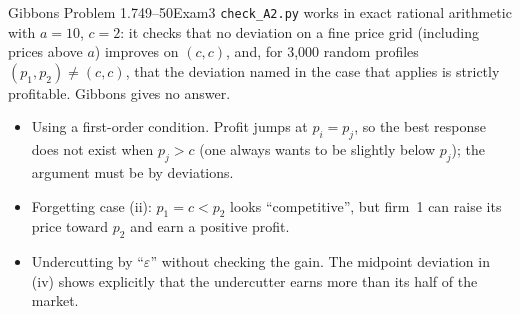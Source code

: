 \begin{exsol}{Gibbons Problem 1.7}{49--50}{Exam}{3}
\verify \texttt{check\_A2.py} works in exact rational arithmetic with $a = 10$, $c = 2$: it checks
that no deviation on a fine price grid (including prices above $a$) improves on $(c,c)$, and, for
3{,}000 random profiles $(p_1,p_2) \ne (c,c)$, that the deviation named in the case that applies is
strictly profitable. Gibbons gives no answer.

\mistakes
\begin{itemize}
  \item Using a first-order condition. Profit jumps at $p_i = p_j$, so the best response does not
  exist when $p_j > c$ (one always wants to be slightly below $p_j$); the argument must be by
  deviations.
  \item Forgetting case (ii): $p_1 = c < p_2$ looks ``competitive'', but firm~1 can raise its price
  toward $p_2$ and earn a positive profit.
  \item Undercutting by ``$\varepsilon$'' without checking the gain. The midpoint deviation in (iv)
  shows explicitly that the undercutter earns more than its half of the market.
\end{itemize}

\end{exsol}
